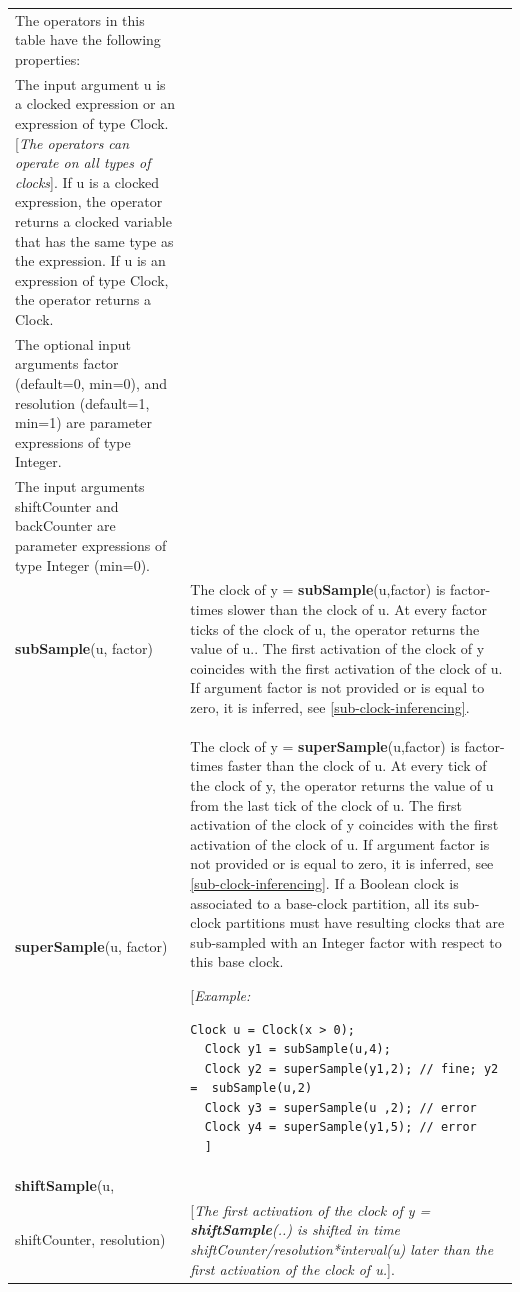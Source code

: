 \documentclass[10pt,a4paper]{report}
\begin{document}
\begin{longtable}[]{@{}ll@{}}
\hline
The operators in this table have the following properties:\\
The input argument u is a clocked expression or an expression of type
Clock. {[}\emph{The operators can operate on all types of clocks}{]}. If
u is a clocked expression, the operator returns a clocked variable that
has the same type as the expression. If u is an expression of type
Clock, the operator returns a Clock.\\
The optional input arguments factor (default=0, min=0), and resolution
(default=1, min=1) are parameter expressions of type Integer.\\
The input arguments shiftCounter and backCounter are parameter
expressions of type Integer (min=0).\\ \hline

\endhead
\textbf{subSample}(u, factor)\strut
&
The clock of y = \textbf{subSample}(u,factor) is factor-times slower
than the clock of u. At every factor ticks of the clock of u, the
operator returns the value of u.. The first activation of the clock of y
coincides with the first activation of the clock of u. If argument
factor is not provided or is equal to zero, it is inferred, see 
\ref{sub-clock-inferencing}.
\\ \hline
\textbf{superSample}(u, factor)\strut
&
The clock of y = \textbf{superSample}(u,factor) is factor-times faster
than the clock of u. At every tick of the clock of y, the operator
returns the value of u from the last tick of the clock of u. The first
activation of the clock of y coincides with the first activation of the
clock of u. If argument factor is not provided or is equal to zero, it
is inferred, see \ref{sub-clock-inferencing}. If a Boolean clock is associated to a
base-clock partition, all its sub-clock partitions must have resulting
clocks that are sub-sampled with an Integer factor with respect to this
base clock.

{[}\emph{Example:}


\begin{lstlisting}[language=modelica]
  Clock u = Clock(x > 0);
  Clock y1 = subSample(u,4);
  Clock y2 = superSample(y1,2); // fine; y2 =  subSample(u,2)
  Clock y3 = superSample(u ,2); // error
  Clock y4 = superSample(y1,5); // error
  ]
\end{lstlisting}
\\ \hline
\textbf{shiftSample}(u,\\
shiftCounter, resolution)\strut
&
{[}\emph{The first activation of the clock of y =
\textbf{shiftSample}(..) is shifted in time
shiftCounter/resolution*interval(u) later than the first activation of
the clock of u.}{]}.


\end{longtable}
\end{document}
